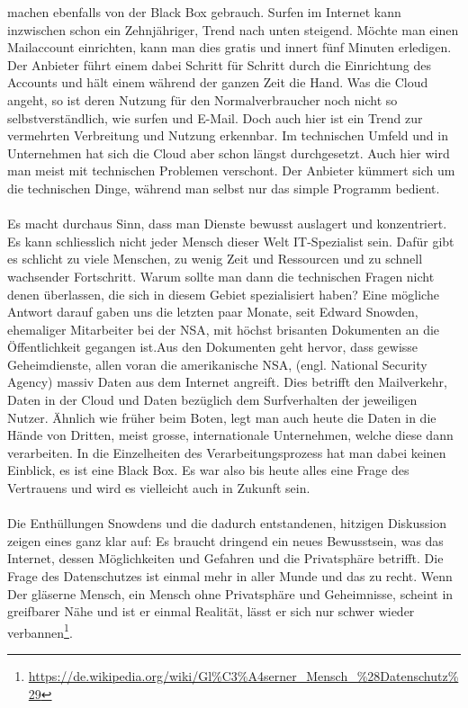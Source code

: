 machen ebenfalls von der Black Box gebrauch. Surfen im Internet kann inzwischen schon ein Zehnjähriger, Trend nach unten steigend. Möchte man einen Mailaccount einrichten, kann man dies gratis und innert fünf Minuten erledigen. Der Anbieter führt einem dabei Schritt für Schritt durch die Einrichtung des Accounts und hält einem während der ganzen Zeit die Hand. Was die Cloud angeht, so ist deren Nutzung für den Normalverbraucher noch nicht so selbstverständlich, wie surfen und E-Mail. Doch auch hier ist ein Trend zur vermehrten Verbreitung und Nutzung erkennbar. Im technischen Umfeld und in Unternehmen hat sich die Cloud aber schon längst durchgesetzt. Auch hier wird man meist mit technischen Problemen verschont. Der Anbieter kümmert sich um die technischen Dinge, während man selbst nur das simple Programm bedient.
\\
\\
Es macht durchaus Sinn, dass man Dienste bewusst auslagert und konzentriert. Es kann schliesslich nicht jeder Mensch dieser Welt IT-Spezialist sein. Dafür gibt es schlicht zu viele Menschen, zu wenig Zeit und Ressourcen und zu schnell wachsender Fortschritt. Warum sollte man dann die technischen Fragen nicht denen überlassen, die sich in diesem Gebiet spezialisiert haben? Eine mögliche Antwort darauf gaben uns die letzten paar Monate, seit Edward Snowden, ehemaliger Mitarbeiter bei der NSA, mit höchst brisanten Dokumenten an die Öffentlichkeit gegangen ist.Aus den Dokumenten geht hervor, dass gewisse Geheimdienste, allen voran die amerikanische NSA, (engl. National Security Agency) massiv Daten aus dem Internet angreift. Dies betrifft den Mailverkehr, Daten in der Cloud und Daten bezüglich dem Surfverhalten der jeweiligen Nutzer. Ähnlich wie früher beim Boten, legt man auch heute die Daten in die Hände von Dritten, meist grosse, internationale Unternehmen, welche diese dann verarbeiten. In die Einzelheiten des Verarbeitungsprozess hat man dabei keinen Einblick, es ist eine Black Box. Es war also bis heute alles eine Frage des Vertrauens und wird es vielleicht auch in Zukunft sein.
\\
\\
Die Enthüllungen Snowdens und die dadurch entstandenen, hitzigen Diskussion zeigen eines ganz klar auf: Es braucht dringend ein neues Bewusstsein, was das Internet, dessen Möglichkeiten und Gefahren und die Privatsphäre betrifft. Die Frage des Datenschutzes ist einmal mehr in aller Munde und das zu recht. Wenn  Der gläserne Mensch, ein Mensch ohne Privatsphäre und Geheimnisse, scheint in greifbarer Nähe und ist er einmal Realität, lässt er sich nur schwer wieder verbannen\footnote{\url{https://de.wikipedia.org/wiki/Gl\%C3\%A4serner_Mensch_\%28Datenschutz\%29}}.
